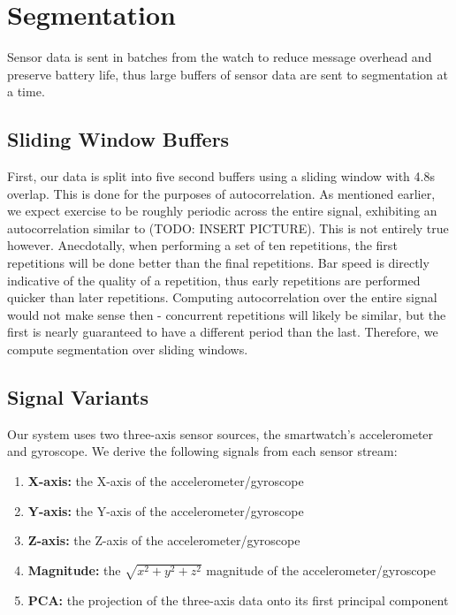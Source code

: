 \section{Segmentation}

Sensor data is sent in batches from the watch to reduce message overhead and preserve battery life, thus large buffers of sensor data are sent to segmentation at a time.

\subsection{Sliding Window Buffers}
First, our data is split into five second buffers using a sliding window with 4.8s overlap. This is done for the purposes of autocorrelation. As mentioned earlier, we expect exercise to be roughly periodic across the entire signal, exhibiting an autocorrelation similar to (TODO: INSERT PICTURE). This is not entirely true however. Anecdotally, when performing a set of ten repetitions, the first repetitions will be done better than the final repetitions. Bar speed is directly indicative of the quality of a repetition, thus early repetitions are performed quicker than later repetitions. Computing autocorrelation over the entire signal would not make sense then - concurrent repetitions will likely be similar, but the first is nearly guaranteed to have a different period than the last. Therefore, we compute segmentation over sliding windows. 

\subsection{Signal Variants}
Our system uses two three-axis sensor sources, the smartwatch's accelerometer and gyroscope. We derive the following signals from each sensor stream:

\begin{enumerate}
    \item \textbf{X-axis:} the X-axis of the accelerometer/gyroscope
    \item \textbf{Y-axis:} the Y-axis of the accelerometer/gyroscope
    \item \textbf{Z-axis:} the Z-axis of the accelerometer/gyroscope
    \item \textbf{Magnitude:} the $\sqrt{x^2 + y^2 + z^2}$ magnitude of the accelerometer/gyroscope
    \item \textbf{PCA:} the projection of the three-axis data onto its first principal component
\end{enumerate}

